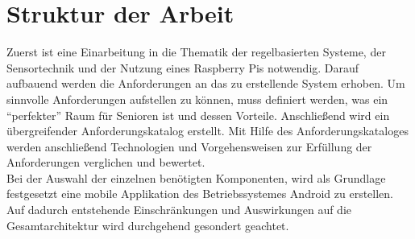\section{Struktur der Arbeit}
Zuerst ist eine Einarbeitung in die Thematik der regelbasierten Systeme, der Sensortechnik und der Nutzung eines Raspberry Pis notwendig. Darauf aufbauend werden die Anforderungen an das zu erstellende System erhoben. Um sinnvolle Anforderungen aufstellen zu können, muss definiert werden, was ein ``perfekter'' Raum für Senioren ist und dessen Vorteile. Anschließend wird ein übergreifender Anforderungskatalog erstellt. Mit Hilfe des Anforderungskataloges werden anschließend Technologien und Vorgehensweisen zur Erfüllung der Anforderungen verglichen und bewertet.\\
Bei der Auswahl der einzelnen benötigten Komponenten, wird als Grundlage festgesetzt eine mobile Applikation des Betriebssystemes Android zu erstellen. Auf dadurch entstehende Einschränkungen und Auswirkungen auf die Gesamtarchitektur wird durchgehend gesondert geachtet. 	